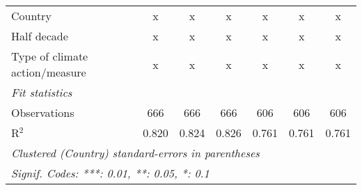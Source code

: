 \begin{tabular}{lcccccc}
   Country                                                  & x       & x             & x             & x             & x             & x\\  
   Half decade                                              & x       & x             & x             & x             & x             & x\\  
   Type of climate action/measure                           & x       & x             & x             & x             & x             & x\\  
   \midrule \emph{Fit statistics}\\
   Observations                                             & 666     & 666           & 666           & 606           & 606           & 606\\  
   R$^2$                                                    & 0.820   & 0.824         & 0.826         & 0.761         & 0.761         & 0.761\\  
   \midrule
   \multicolumn{7}{l}{\emph{Clustered (Country) standard-errors in parentheses}}\\
   \multicolumn{7}{l}{\emph{Signif. Codes: ***: 0.01, **: 0.05, *: 0.1}}\\
\end{tabular}
\par\endgroup


